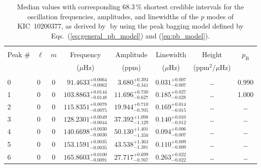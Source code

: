 \begin{table*}[!]
\caption{Median values with corresponding 68.3\,\% shortest credible intervals for the oscillation frequencies, amplitudes, and linewidths of the $p$ modes of KIC~10200377, as derived by \diamonds\,\,by using the peak bagging model defined by Eqs.~(\ref{eq:general_pb_model}) and (\ref{eq:pb_model}).}
\label{tab:10200377p}
\centering
\begin{tabular}{llcrrlrc}
\hline\hline
\\[-8pt]
Peak \# & $\ell$ & $m$ & \multicolumn{1}{c}{Frequency} & \multicolumn{1}{c}{Amplitude} & \multicolumn{1}{c}{Linewidth} & \multicolumn{1}{c}{Height}& $p_\mathrm{B}$\\
 & & & \multicolumn{1}{c}{($\mu$Hz)} & \multicolumn{1}{c}{(ppm)} & \multicolumn{1}{c}{($\mu$Hz)} & \multicolumn{1}{c}{(ppm$^2/\mu$Hz)}\\
\hline \\[-8pt]
0 & 0 & 0 & $     91.4633_{-      0.0062}^{+      0.0064}$ & $       3.680_{-       0.341}^{+       0.393}$ & $       0.031_{-       0.007}^{+       0.007}$ & \multicolumn{1}{c}{\dots} & 0.990\\[1pt]
1 & 0 & 0 & $    103.8863_{-      0.0148}^{+      0.0144}$ & $      11.696_{-       0.627}^{+       0.730}$ & $       0.185_{-       0.028}^{+       0.027}$ & \multicolumn{1}{c}{\dots} & 1.000\\[1pt]
2 & 0 & 0 & $    115.8351_{-      0.0075}^{+      0.0078}$ & $      19.944_{-       0.705}^{+       0.710}$ & $       0.169_{-       0.015}^{+       0.014}$ & \multicolumn{1}{c}{\dots} & \dots \\[1pt]
3 & 0 & 0 & $    128.2301_{-      0.0044}^{+      0.0049}$ & $      37.392_{-       1.129}^{+       1.098}$ & $       0.140_{-       0.012}^{+       0.010}$ & \multicolumn{1}{c}{\dots} & \dots \\[1pt]
4 & 0 & 0 & $    140.6698_{-      0.0030}^{+      0.0030}$ & $      50.130_{-       1.350}^{+       1.401}$ & $       0.094_{-       0.007}^{+       0.006}$ & \multicolumn{1}{c}{\dots} & \dots \\[1pt]
5 & 0 & 0 & $    153.1591_{-      0.0035}^{+      0.0035}$ & $      43.538_{-       1.381}^{+       1.363}$ & $       0.110_{-       0.009}^{+       0.009}$ & \multicolumn{1}{c}{\dots} & \dots \\[1pt]
6 & 0 & 0 & $    165.8603_{-      0.0091}^{+      0.0100}$ & $      27.717_{-       0.767}^{+       0.699}$ & $       0.263_{-       0.022}^{+       0.022}$ & \multicolumn{1}{c}{\dots} & \dots \\[1pt]

\end{tabular}
\end{table*}
